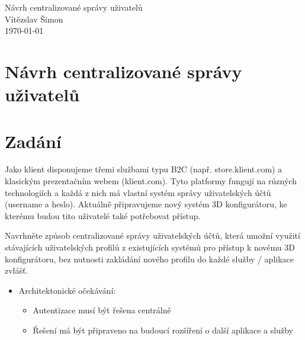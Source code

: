 \documentclass[a4paper,12pt]{article}
\newcommand{\auth}{Vítězslav Šimon}
\newcommand{\docname}{Návrh centralizované správy uživatelů}
\begin{document}
\begin{titlepage}
\vspace*{5cm}
\begin{center}
{\Huge \docname}\\[1cm]
{\Large \auth}\\[1cm]
{\today}
\end{center}
\end{titlepage}

\newpage

\pagestyle{plain}

\tableofcontents
\pagestyle{plain}
\newpage

\section{Návrh centralizované správy uživatelů}

\section{Zadání}

Jako klient disponujeme třemi službami typu B2C (např. store.klient.com) a
klasickým prezentačním webem (klient.com). Tyto platformy fungují na různých technologiích a
každá z nich má vlastní systém správy uživatelských účtů (username a heslo). Aktuálně
připravujeme nový systém 3D konfigurátoru, ke kterému budou tito uživatelé také potřebovat
přístup.\par

Navrhněte způsob centralizované správy uživatelských účtů, která umožní využití
stávajících uživatelských profilů z existujících systémů pro přístup k novému 3D konfigurátoru,
bez nutnosti zakládání nového profilu do každé služby / aplikace zvlášť.\par

\begin{itemize}

\item Architektonické očekávání:\begin{itemize}

\item Autentizace musí být řešena centrálně

\item Řešení má být připraveno na budoucí rozšíření o další aplikace a služby

\end{itemize}



\end{itemize}
\end{document}
